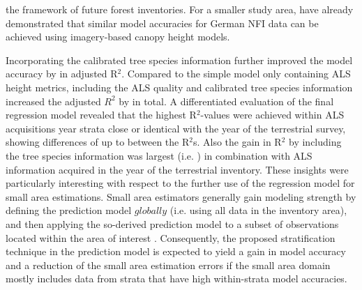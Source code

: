 {the framework of future forest inventories. For a smaller study area, \citet{kirchhoefer2017} have already demonstrated that similar model accuracies for German NFI data can be achieved using imagery-based canopy height models.}\par

Incorporating the calibrated tree species information further improved the model accuracy by  in adjusted R$^2$. Compared to the simple model only containing ALS height metrics, including the ALS quality and calibrated tree species information increased the adjusted $R^2$ by  in total. A differentiated evaluation of the final regression model revealed that the highest R$^2$-values were achieved within ALS acquisitions year strata close or identical with the year of the terrestrial survey, showing differences of up to  between the R$^2$s. Also the gain in R$^2$ by including the tree species information was largest (i.e. ) in combination with ALS information acquired in the year of the terrestrial inventory. These insights were particularly interesting with respect to the further use of the regression model for small area estimations. Small area estimators generally gain modeling strength by defining the prediction model $globally$ (i.e. using all data in the inventory area), and then applying the so-derived prediction model to a subset of observations located within the area of interest \citep{mandallaz2013a}. Consequently, the proposed stratification technique in the prediction model is expected to yield a gain in model accuracy and a reduction of the small area estimation errors if the small area domain mostly includes data from strata that have high within-strata model accuracies. \par


